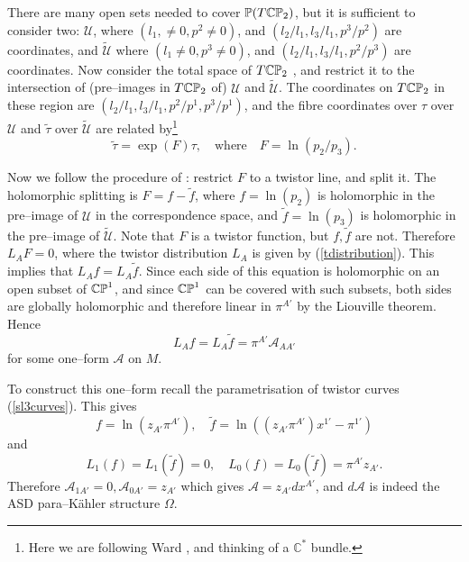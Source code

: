  There are many open sets needed to cover
$\mathbb{P}(T\mathbb{CP}_2)$, but it is sufficient to consider two:
$\mathcal{U}$, where $(l_1, \neq 0, p^2\neq 0)$, and $(l_2/l_1, l_3/l_1, p^3/p^2)$ are coordinates, and $\widetilde{\mathcal{U}}$ where
$(l_1\neq 0, p^3\neq 0)$, and  $(l_2/l_1, l_3/l_1, p^2/p^3)$
are coordinates. Now consider the total
space of $T\mathbb{CP}_2$%
, and restrict it to the intersection of (pre--images in
$T\mathbb{CP}_2$
of) $\mathcal{U}$ and $\widetilde{\mathcal{U}}$. The coordinates on $T\mathbb{CP}_2$ in these
region are $(l_2/l_1, l_3/l_1, p^2/p^1, p^3/p^1)$, and the fibre
coordinates over $\tau$ over $\mathcal{U}$ and $\tilde{\tau}$ over 
$\widetilde{\mathcal{U}}$ are related by\footnote{Here we are following Ward \cite{wardtf},
and thinking of a $\mathbb{C}^*$ bundle.}
\[
\tilde \tau=\exp(F)\tau, \quad\mbox{where}\quad  
F=\ln{(p_2/p_3)}.
\]

Now we follow the procedure of \cite{wardtf}: restrict $F$ to a twistor line,
and split it.
The holomorphic splitting is $F=f-\widetilde{f}$, where
$f=\ln{(p_2)}$ is holomorphic in the pre--image of $\mathcal{U}$ in the correspondence space, and 
$\widetilde{f}=\ln{(p_3)}$ is holomorphic in the pre--image of
$\widetilde{\mathcal{U}}$. Note that $F$ is a twistor  function, but 
$f, \widetilde{f}$ are not. Therefore
$L_{A}F=0$, where the twistor distribution $L_{A}$
is given by (\ref{tdistribution}). This implies that $L_{A}f=L_{A}\widetilde{f}$. Since each side of this equation is holomorphic on an open subset of $\mathbb{CP}^1$, and since $\mathbb{CP}^1$ can be covered with such subsets, both sides are globally holomorphic and therefore linear in $\pi^{A'}$ by the Liouville theorem. Hence
\[
L_{A}f=L_{A}\widetilde{f}=\pi^{A'}\mathcal{A}_{AA'}
\]
for some one--form $\mathcal{A}$ on $M$.

To construct this one--form recall the parametrisation
of twistor curves (\ref{sl3curves}). This gives
\[
f=\ln{(z_{A'}\pi^{A'})}, \quad\widetilde{f}=\ln{((z_{A'}\pi^{A'})x^{1'}-\pi^{1'})}
\]
and
\[
L_{1}(f)=L_{1}(\widetilde{f})=0, \quad
L_{0}(f)=L_{0}(\widetilde{f})=\pi^{A'} z_{A'}.
\]
Therefore ${\mathcal A}_{1A'}=0, {\mathcal A}_{0A'}=z_{A'}$
which gives ${\mathcal A}=z_{A'}dx^{A'}$, and $d{\mathcal A}$
is indeed the ASD para--K\"ahler structure $\Omega$.
\koniec
